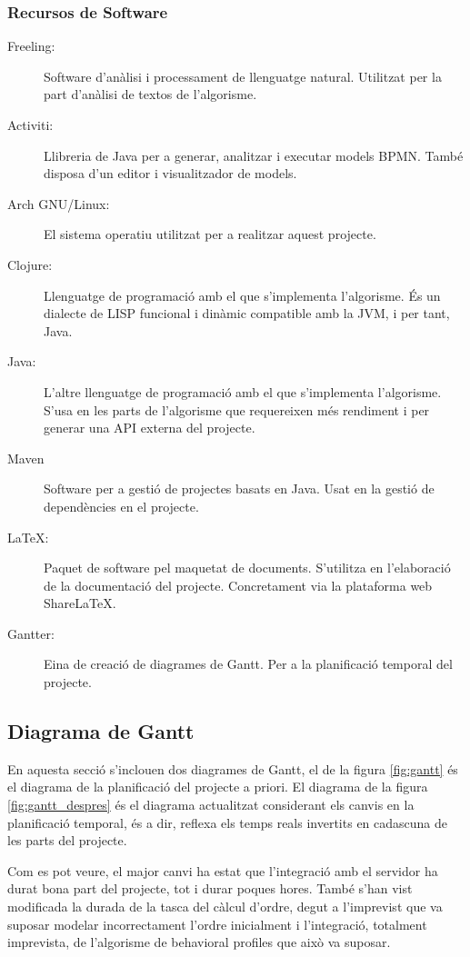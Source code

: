 \subsubsection{Recursos de Software}

\begin{description}
    \item[Freeling:]{Software d'anàlisi i processament de llenguatge natural. Utilitzat per la part d'anàlisi de textos de l'algorisme.}
    \item[Activiti:]{Llibreria de Java per a generar, analitzar i executar models BPMN. També disposa d'un editor i visualitzador de models.}
    \item[Arch GNU/Linux:]{El sistema operatiu utilitzat per a realitzar aquest projecte.}
    \item[Clojure:]{Llenguatge de programació amb el que s'implementa l'algorisme. És un dialecte de LISP funcional i dinàmic compatible amb la JVM, i per tant, Java.}
    \item[Java:]{L'altre llenguatge de programació amb el que s'implementa l'algorisme. S'usa en les parts de l'algorisme que requereixen més rendiment i per generar una API externa del projecte.}
    \item[Maven]{Software per a gestió de projectes basats en Java. Usat en la gestió de dependències en el projecte.}
    \item[\LaTeX:]{Paquet de software pel maquetat de documents. S'utilitza en l'elaboració de la documentació del projecte. Concretament via la plataforma web Share\LaTeX.}
    \item[Gantter:]{Eina de creació de diagrames de Gantt. Per a la planificació temporal del projecte.}
\end{description}

\subsection{Diagrama de Gantt}
\label{gantt}

En aquesta secció s'inclouen dos diagrames de Gantt, el de la figura \ref{fig:gantt} és el diagrama de la planificació del projecte a priori. El diagrama de la figura \ref{fig:gantt_despres} és el diagrama actualitzat considerant els canvis en la planificació temporal, és a dir, reflexa els temps reals invertits en cadascuna de les parts del projecte.

Com es pot veure, el major canvi ha estat que l'integració amb el servidor ha durat bona part del projecte, tot i durar poques hores. També s'han vist modificada la durada de la tasca del càlcul d'ordre, degut a l'imprevist que va suposar modelar incorrectament l'ordre inicialment i l'integració, totalment imprevista, de l'algorisme de behavioral profiles que això va suposar.

